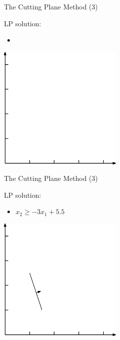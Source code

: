 \documentclass[10pt]{beamer}
\begin{document}
\begin{frame}[t]{The Cutting Plane Method (3)}
        \begin{minipage}[t]{0.48\textwidth}
            LP solution:        
            \begin{itemize}
                \item[ ]
            \end{itemize}
        \end{minipage}
        \begin{minipage}[t]{0.48\textwidth}
            \begin{center}
                \includegraphics[width=6cm]{cutting_plane000.eps} 
            \end{center}
        \end{minipage}        
\end{frame}


\begin{frame}[t]{The Cutting Plane Method (3)}
        \begin{minipage}[t]{0.48\textwidth}
            LP solution:        
            \begin{itemize}
                \item $ x_2 \geq -3x_1 + 5.5 $
            \end{itemize}
        \end{minipage}
        \begin{minipage}[t]{0.48\textwidth}
            \begin{center}
                \includegraphics[width=6cm]{cutting_plane001.eps} 
            \end{center}
        \end{minipage}        
\end{frame}
\end{document}
